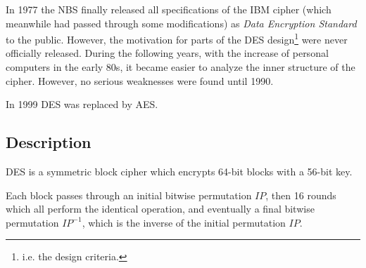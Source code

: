 \documentclass{article}
\begin{document}
  In 1977 the NBS finally released all specifications of the IBM cipher 
  (which meanwhile had passed through some modifications) as 
  \emph{Data Encryption Standard} to the public. 
  However, the motivation for parts of the DES design\footnote{i.e.
  the design criteria.} were never officially released.
  During the following years, with the increase of personal computers
  in the early 80s, it became easier to analyze the inner structure of
  the cipher. However, no serious weaknesses were found until 1990.

  In 1999 DES was replaced by AES.

  \subsection{Description}

  DES is a symmetric block cipher which encrypts 64-bit blocks with a
  56-bit key. 

  \begin{center}
  \end{center}


  Each block passes through an initial bitwise permutation $IP$, then 
  16 rounds which all perform the identical operation, and eventually 
  a final bitwise permutation $IP^{-1}$, which is the inverse of the
  initial permutation $IP$.
  
  \begin{center}
  \end{center}
\end{document}

